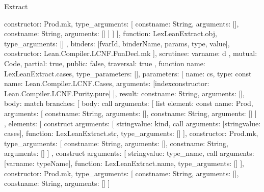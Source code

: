 \begin{lexlean}{Extract}
\begin{toolingmodule}
{{{{{{{                      constructor: Prod.mk,
                      type_arguments: [
                        const{name: String, arguments: []},
                        const{name: String, arguments: []}
                      ]
                    }
                  ]
                }
              ],
              function: LexLeanExtract.obj,
              type_arguments: []
            },
            binders: [fvarId, binderName, params, type, value],
            constructor: Lean.Compiler.LCNF.FunDecl.mk
          }
        ],
        scrutinee: var{name: d}
      },
      mutual: Code,
      partial: true,
      public: false,
      traversal: true
    },
    function{
      name: LexLeanExtract.cases,
      type_parameters: [],
      parameters: [
        {
          name: cs,
          type: const{
            name: Lean.Compiler.LCNF.Cases,
            arguments: [index{constructor: Lean.Compiler.LCNF.Purity.pure}]
          }
        }
      ],
      result: const{name: String, arguments: []},
      body: match{
        branches: [
          {
            body: call{
              arguments: [
                list{
                  element: const{
                    name: Prod,
                    arguments: [
                      const{name: String, arguments: []},
                      const{name: String, arguments: []}
                    ]
                  },
                  elements: [
                    construct{
                      arguments: [
                        string{value: kind},
                        call{
                          arguments: [string{value: cases}],
                          function: LexLeanExtract.str,
                          type_arguments: []
                        }
                      ],
                      constructor: Prod.mk,
                      type_arguments: [
                        const{name: String, arguments: []},
                        const{name: String, arguments: []}
                      ]
                    },
                    construct{
                      arguments: [
                        string{value: type_name},
                        call{
                          arguments: [var{name: typeName}],
                          function: LexLeanExtract.name,
                          type_arguments: []
                        }
                      ],
                      constructor: Prod.mk,
                      type_arguments: [
                        const{name: String, arguments: []},
                        const{name: String, arguments: []}
                      ]
}}}}}}}
\end{toolingmodule}
\end{lexlean}
